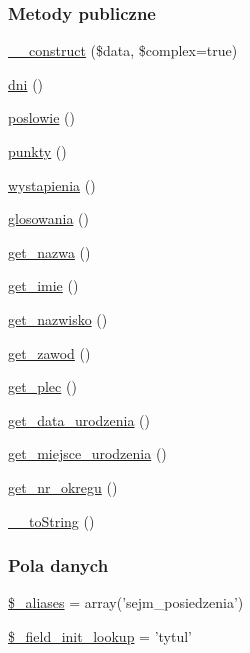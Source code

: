 \subsubsection*{Metody publiczne}
\begin{DoxyCompactItemize}
\item 
\hyperlink{classep___sejm___posiedzenie_a8c384d5e0f13f64cbf8c51096faa7738}{\-\_\-\-\_\-construct} (\$data, \$complex=true)
\item 
\hyperlink{classep___sejm___posiedzenie_ad8bc0547af9d7792114185786ca4d8e9}{dni} ()
\item 
\hyperlink{classep___sejm___posiedzenie_a0f86bc9d504d1c4a3a60c1585cb85f97}{poslowie} ()
\item 
\hyperlink{classep___sejm___posiedzenie_a3ac343e2a424bd292fff8ff5301666c4}{punkty} ()
\item 
\hyperlink{classep___sejm___posiedzenie_a18b1bf1c04262c23e5edc5c81a4f897c}{wystapienia} ()
\item 
\hyperlink{classep___sejm___posiedzenie_a053e53f5c6126e89ed49774ba8f12ec9}{glosowania} ()
\item 
\hyperlink{classep___sejm___posiedzenie_ac0818f0049d7b84f08f77128f54cee36}{get\-\_\-nazwa} ()
\item 
\hyperlink{classep___sejm___posiedzenie_ac4b0c85dc2a130038f2d118dbd0c3d77}{get\-\_\-imie} ()
\item 
\hyperlink{classep___sejm___posiedzenie_abdd1d7ff92508da7f748ba1feec97af0}{get\-\_\-nazwisko} ()
\item 
\hyperlink{classep___sejm___posiedzenie_af80ca8310b60004454dd02a387deaa2c}{get\-\_\-zawod} ()
\item 
\hyperlink{classep___sejm___posiedzenie_ac7f9af5c3fa024e4c26a7b6bd4ce4bb4}{get\-\_\-plec} ()
\item 
\hyperlink{classep___sejm___posiedzenie_a880b240cd2d8c336fd1709bf0cb1ae2c}{get\-\_\-data\-\_\-urodzenia} ()
\item 
\hyperlink{classep___sejm___posiedzenie_ac57c08ec5e394a19c5bd9280c8376182}{get\-\_\-miejsce\-\_\-urodzenia} ()
\item 
\hyperlink{classep___sejm___posiedzenie_a2645a9f0aa5b0ccc482943348c033d0a}{get\-\_\-nr\-\_\-okregu} ()
\item 
\hyperlink{classep___sejm___posiedzenie_a7516ca30af0db3cdbf9a7739b48ce91d}{\-\_\-\-\_\-to\-String} ()
\end{DoxyCompactItemize}
\subsubsection*{Pola danych}
\begin{DoxyCompactItemize}
\item 
\hyperlink{classep___sejm___posiedzenie_ab4e31d75f0bc5d512456911e5d01366b}{\$\-\_\-aliases} = array('sejm\-\_\-posiedzenia')
\item 
\hyperlink{classep___sejm___posiedzenie_a4a4d54ae35428077a7c61ec8a5139af3}{\$\-\_\-field\-\_\-init\-\_\-lookup} = 'tytul'
\end{DoxyCompactItemize}

